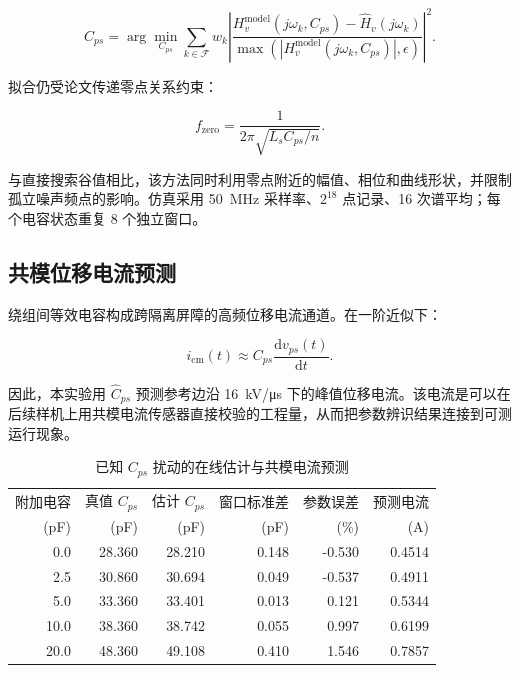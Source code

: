 \documentclass[UTF8,a4paper,12pt]{ctexart}
\begin{document}
\begin{equation}
\hat C_{ps}=\arg\min_{C_{ps}}
\sum_{k\in\mathcal F}w_k
\left|
\frac{H_v^{\mathrm{model}}(j\omega_k,C_{ps})-
\hat H_v(j\omega_k)}
{\max(|H_v^{\mathrm{model}}(j\omega_k,C_{ps})|,\epsilon)}
\right|^2.
\end{equation}

拟合仍受论文传递零点关系约束：

\begin{equation}
f_{\mathrm{zero}}=\frac{1}{2\pi\sqrt{L_sC_{ps}/n}}.
\end{equation}

与直接搜索谷值相比，该方法同时利用零点附近的幅值、相位和曲线形状，并限制孤立噪声频点的影响。仿真采用 \SI{50}{MHz} 采样率、$2^{18}$ 点记录、16 次谱平均；每个电容状态重复 8 个独立窗口。

\subsection{共模位移电流预测}

绕组间等效电容构成跨隔离屏障的高频位移电流通道。在一阶近似下：

\begin{equation}
i_{\mathrm{cm}}(t)\approx C_{ps}\frac{\mathrm d v_{ps}(t)}{\mathrm dt}.
\end{equation}

因此，本实验用 $\hat C_{ps}$ 预测参考边沿 \SI{16}{kV/\micro\second} 下的峰值位移电流。该电流是可以在后续样机上用共模电流传感器直接校验的工程量，从而把参数辨识结果连接到可测运行现象。

\begin{table}[H]
\centering
\caption{已知 $C_{ps}$ 扰动的在线估计与共模电流预测}
\begin{tabular}{rrrrrr}
\toprule
附加电容 & 真值 $C_{ps}$ & 估计 $C_{ps}$ & 窗口标准差 & 参数误差 & 预测电流 \\
(pF) & (pF) & (pF) & (pF) & (\%) & (A) \\
\midrule
0.0  & 28.360 & 28.210 & 0.148 & -0.530 & 0.4514 \\
2.5  & 30.860 & 30.694 & 0.049 & -0.537 & 0.4911 \\
5.0  & 33.360 & 33.401 & 0.013 &  0.121 & 0.5344 \\
10.0 & 38.360 & 38.742 & 0.055 &  0.997 & 0.6199 \\
20.0 & 48.360 & 49.108 & 0.410 &  1.546 & 0.7857 \\
\bottomrule
\end{tabular}
\end{table}
\end{document}
